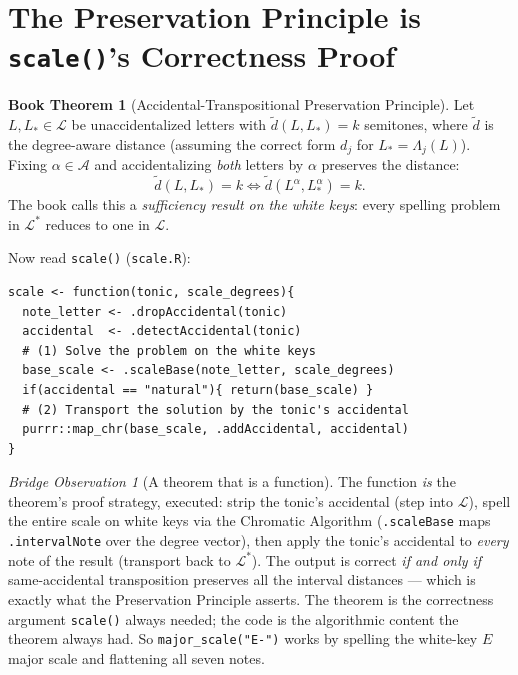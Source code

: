\documentclass[11pt]{article}
\newcommand{\MAlph}{\mathcal{L}}                 %
\newcommand{\Lstar}{\MAlph^{*}}                  %
\newcommand{\Lam}{\Lambda}                      %
\newcommand{\Accset}{\mathcal{A}}               %
\newcommand{\dist}{\tilde{d}}                   %
\theoremstyle{definition}
\newtheorem{bookthm}[bookdef]{Book Theorem}
\theoremstyle{remark}
\newtheorem{bridge}{Bridge Observation}[section]
\newcommand{\code}[1]{\texttt{#1}}
\newcommand{\file}[1]{\texttt{#1}}
\begin{document}
\section{The Preservation Principle is \code{scale()}'s Correctness Proof}
\label{sec:preservation}

\begin{bookthm}[Accidental-Transpositional Preservation Principle]
Let $L, L_* \in \MAlph$ be unaccidentalized letters with
$\dist(L, L_*) = k$ semitones, where $\dist$ is the degree-aware distance
(assuming the correct form $d_j$ for $L_* = \Lam_j(L)$). Fixing
$\alpha \in \Accset$ and accidentalizing \emph{both} letters by $\alpha$
preserves the distance:
$$\dist(L, L_*) = k \iff \dist(L^{\alpha}, L_*^{\alpha}) = k.$$
The book calls this a \emph{sufficiency result on the white keys}: every
spelling problem in $\Lstar$ reduces to one in $\MAlph$.
\end{bookthm}

Now read \code{scale()} (\file{scale.R}):

\begin{lstlisting}
scale <- function(tonic, scale_degrees){
  note_letter <- .dropAccidental(tonic)
  accidental  <- .detectAccidental(tonic)
  # (1) Solve the problem on the white keys
  base_scale <- .scaleBase(note_letter, scale_degrees)
  if(accidental == "natural"){ return(base_scale) }
  # (2) Transport the solution by the tonic's accidental
  purrr::map_chr(base_scale, .addAccidental, accidental)
}
\end{lstlisting}

\begin{bridge}[A theorem that is a function]\label{obs:thmfunction}
The function \emph{is} the theorem's proof strategy, executed:
strip the tonic's accidental (step into $\MAlph$), spell the entire scale on
white keys via the Chromatic Algorithm (\code{.scaleBase} maps
\code{.intervalNote} over the degree vector), then apply the tonic's accidental
to \emph{every} note of the result (transport back to $\Lstar$). The output is
correct \emph{if and only if} same-accidental transposition preserves all the
interval distances --- which is exactly what the Preservation Principle asserts.
The theorem is the correctness argument \code{scale()} always needed; the code
is the algorithmic content the theorem always had. So
\code{major\_scale("E-")} works by spelling the white-key $E$ major scale and
flattening all seven notes.
\end{bridge}
\end{document}
